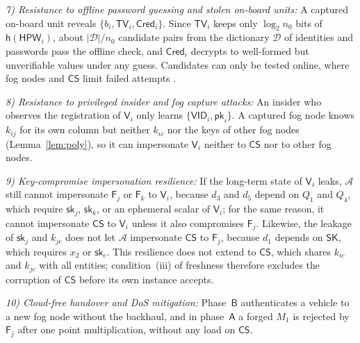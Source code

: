 \documentclass[journal]{IEEEtran}
\theoremstyle{plain}
\theoremstyle{definition}
\newcommand{\Veh}{\mathsf{V}}            %
\newcommand{\Fog}{\mathsf{F}}            %
\newcommand{\CS}{\mathsf{CS}}            %
\newcommand{\Adv}{\mathcal{A}}           %
\newcommand{\SK}{\mathsf{SK}}            %
\newcommand{\VID}{\mathsf{VID}}          %
\newcommand{\HPW}{\mathsf{HPW}}          %
\newcommand{\TV}{\mathsf{TV}}            %
\newcommand{\Cred}{\mathsf{Cred}}        %
\newcommand{\h}{\mathsf{h}}              %
\newcommand{\sk}{\mathsf{sk}}            %
\newcommand{\pk}{\mathsf{pk}}            %
\begin{document}
\emph{7) Resistance to offline password guessing and stolen on-board units:} A captured on-board unit reveals $\{b_i,\TV_i,\Cred_i\}$. Since $\TV_i$ keeps only $\log_2 n_0$ bits of $\h(\HPW_i)$, about $|\mathcal{D}|/n_0$ candidate pairs from the dictionary $\mathcal{D}$ of identities and passwords pass the offline check, and $\Cred_i$ decrypts to well-formed but unverifiable values under any guess. Candidates can only be tested online, where fog nodes and $\CS$ limit failed attempts \cite{wang2018two}.

\emph{8) Resistance to privileged insider and fog capture attacks:} An insider who observes the registration of $\Veh_i$ only learns $\{\VID_i,\pk_i\}$. A captured fog node knows $k_{ij}$ for its own column but neither $k_{ic}$ nor the keys of other fog nodes (Lemma~\ref{lem:poly}), so it can impersonate $\Veh_i$ neither to $\CS$ nor to other fog nodes.

\emph{9) Key-compromise impersonation resilience:} If the long-term state of $\Veh_i$ leaks, $\Adv$ still cannot impersonate $\Fog_j$ or $\Fog_k$ to $\Veh_i$, because $d_3$ and $d_5$ depend on $Q_1$ and $Q_4$, which require $\sk_j$, $\sk_k$, or an ephemeral scalar of $\Veh_i$; for the same reason, it cannot impersonate $\CS$ to $\Veh_i$ unless it also compromises $\Fog_j$. Likewise, the leakage of $\sk_j$ and $k_{jc}$ does not let $\Adv$ impersonate $\CS$ to $\Fog_j$, because $d_1$ depends on $\SK$, which requires $x_2$ or $\sk_c$. This resilience does not extend to $\CS$, which shares $k_{ic}$ and $k_{jc}$ with all entities; condition~(iii) of freshness therefore excludes the corruption of $\CS$ before its own instance accepts.

\emph{10) Cloud-free handover and DoS mitigation:} Phase~$\mathsf{B}$ authenticates a vehicle to a new fog node without the backhaul, and in phase~$\mathsf{A}$ a forged $M_1$ is rejected by $\Fog_j$ after one point multiplication, without any load on $\CS$.
\end{document}
